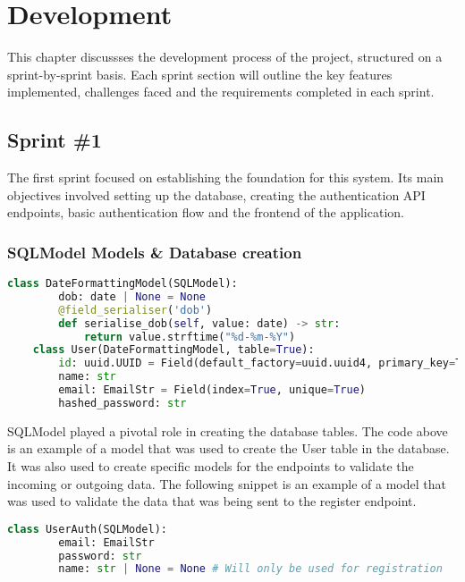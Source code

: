 \chapter{Development}\label{ch:development}

This chapter discussses the development process of the project, structured on a sprint-by-sprint basis. Each sprint section will outline the key features implemented, challenges faced and the requirements completed in each sprint.

\section{Sprint \#1}

The first sprint focused on establishing the foundation for this system. Its main objectives involved setting up the database, creating the authentication API endpoints, basic authentication flow and the frontend of the application.

\subsection{SQLModel Models \& Database creation}

\begin{lstlisting}[language=Python, caption=SQLModel User Model]
    class DateFormattingModel(SQLModel):
        dob: date | None = None
        @field_serialiser('dob')
        def serialise_dob(self, value: date) -> str:
            return value.strftime("%d-%m-%Y")
    class User(DateFormattingModel, table=True):
        id: uuid.UUID = Field(default_factory=uuid.uuid4, primary_key=True)
        name: str
        email: EmailStr = Field(index=True, unique=True)
        hashed_password: str
\end{lstlisting}

SQLModel played a pivotal role in creating the database tables. The code above is an example of a model that was used to create the User table in the database. It was also used to create specific models for the endpoints to validate the incoming or outgoing data. The following snippet is an example of a model that was used to validate the data that was being sent to the register endpoint.

\begin{lstlisting}[language=Python, caption=SQLModel Authenticatio Model]
    class UserAuth(SQLModel):
        email: EmailStr
        password: str
        name: str | None = None # Will only be used for registration
\end{lstlisting}

